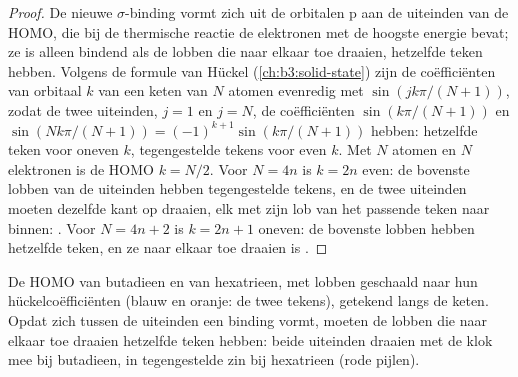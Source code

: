 \begin{proof}
De nieuwe $\sigma$-binding vormt zich uit de orbitalen p aan de uiteinden van de HOMO,
die bij de thermische reactie de elektronen met de hoogste energie
bevat; ze is alleen bindend als de lobben die naar elkaar toe draaien,
hetzelfde teken hebben. Volgens de formule van Hückel
(\cref{ch:b3:solid-state}) zijn de coëfficiënten van orbitaal $k$ van een keten van $N$ atomen
evenredig met $\sin(jk\pi/(N + 1))$, zodat de twee uiteinden, $j = 1$ en $j = N$, de
coëfficiënten $\sin(k\pi/(N + 1))$ en $\sin(Nk\pi/(N + 1)) = (-1)^{k+1}\sin(k\pi/(N + 1))$ hebben: hetzelfde teken voor oneven $k$,
tegengestelde tekens voor even $k$. Met $N$ atomen en $N$ elektronen is de HOMO
$k = N/2$. Voor $N = 4n$ is $k = 2n$ even: de bovenste lobben van de uiteinden hebben
tegengestelde tekens, en de twee uiteinden moeten dezelfde kant op
draaien, elk met zijn lob van het passende teken naar binnen:
. Voor $N = 4n + 2$ is $k = 2n + 1$ oneven: de bovenste lobben
hebben hetzelfde teken, en ze naar elkaar toe draaien is .
\end{proof}

\begin{omfigure}

{\small De HOMO van butadieen en van hexatrieen, met lobben geschaald naar
hun hückelcoëfficiënten (blauw en oranje: de twee tekens), getekend langs
de keten. Opdat zich tussen de uiteinden een binding vormt, moeten de
lobben die naar elkaar toe draaien hetzelfde teken hebben: beide
uiteinden draaien met de klok mee bij butadieen, in tegengestelde zin bij
hexatrieen (rode pijlen).}
\end{omfigure}

